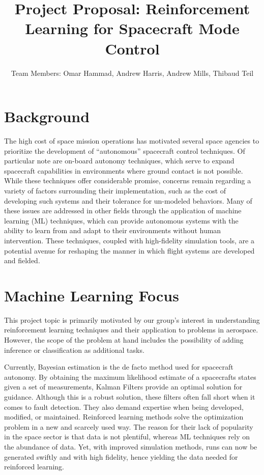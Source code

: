 \documentclass[]{article}
\title{Project Proposal: Reinforcement Learning for Spacecraft Mode Control}
\author{Team Members: Omar Hammad, Andrew Harris, Andrew Mills, Thibaud Teil}
\begin{document}
\maketitle


\section{Background}

The high cost of space mission operations has motivated several space agencies to prioritize the development of ``autonomous'' spacecraft control techniques. Of particular note are on-board autonomy techniques, which serve to expand spacecraft capabilities in environments where ground contact is not possible. While these techniques offer considerable promise, concerns remain regarding a variety of factors surrounding their implementation, such as the cost of developing such systems and their tolerance for un-modeled behaviors. Many of these issues are addressed in other fields through the application of machine learning (ML) techniques, which can provide autonomous systems with the ability to learn from and adapt to their environments without human intervention. These techniques, coupled with high-fidelity simulation tools, are a potential avenue for reshaping the manner in which flight systems are developed and fielded. 



\section{Machine Learning Focus}

This project topic is primarily motivated by our group's interest in understanding reinforcement learning techniques and their application to problems in aerospace. However, the scope of the problem at hand includes the possibility of adding inference or classification as additional tasks.

Currently, Bayesian estimation is the de facto method used for spacecraft autonomy. By obtaining the maximum likelihood estimate of a spacecrafts states given a set of measurements, Kalman Filters provide an optimal solution for guidance. Although this is a robust solution, these filters often fall short when it comes to fault detection. They also demand expertise when being developed, modified, or maintained. Reinforced learning methods solve the optimization problem in a new and scarcely used way. The reason for their lack of popularity in the space sector is that data is not plentiful, whereas ML techniques rely on the abundance of data. Yet, with improved simulation methods, runs can now be generated swiftly and with high fidelity, hence yielding the data needed for reinforced learning. 
\end{document}
